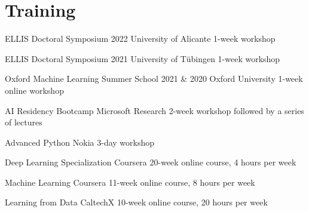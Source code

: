 \documentclass[]{friggeri-cv_osx}
\begin{document}
\section{Training}
\begin{entrylist}

\entry
{}
{ELLIS Doctoral Symposium 2022}
{University of Alicante}
{1-week workshop}

\entry
{}
{ELLIS Doctoral Symposium 2021}
{University of Tübingen}
{1-week workshop}

\entry
{}
{Oxford Machine Learning Summer School 2021 \& 2020}
{Oxford University}
{1-week online workshop}

\entry
{}
{AI Residency Bootcamp}
{Microsoft Research}
{2-week workshop followed by a series of lectures}

\entry
{}
{Advanced Python}
{Nokia}
{3-day workshop}

\entry
{}
{Deep Learning Specialization}
{Coursera}
{20-week online course, 4 hours per week}

\entry
{}
{Machine Learning}
{Coursera}
{11-week online course, 8 hours per week}

\entry
{}
{Learning from Data}
{CaltechX}
{10-week online course, 20 hours per week}

\end{entrylist}
\end{document}
